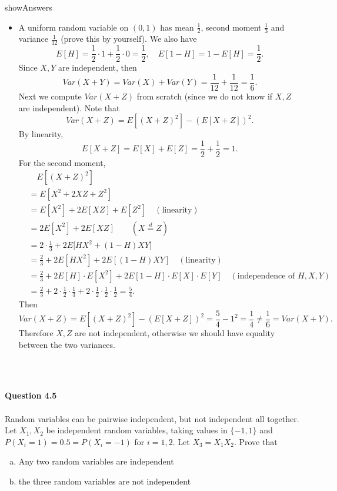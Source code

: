 \documentclass{article}
\begin{document}
\begin{maybePrint}{showAnswers}
{\begin{itemize}
\item[(b)] A uniform random variable on $(0,1)$ has mean $\frac{1}{2}$, second moment $\frac{1}{3}$ and variance $\frac{1}{12}$ (prove this by yourself). We also have 
$$ E[H]=\frac{1}{2}\cdot 1+\frac{1}{2}\cdot 0=\frac{1}{2}, \quad  E[1-H]=1- E[H]=\frac{1}{2}.$$
Since $X,Y$ are independent, then
$$ Var(X+Y)= Var(X)+ Var(Y)=\frac{1}{12}+\frac{1}{12}=\frac{1}{6}.$$
Next we compute $ Var(X+Z)$ from scratch (since we do not know if $X,Z$ are independent). Note that 
$$ Var(X+Z)= E[(X+Z)^2]-( E[X+Z])^2.$$
By linearity, 
$$ E[X+Z]= E[X]+ E[Z]=\frac{1}{2}+\frac{1}{2}=1.$$
For the second moment,
\begin{align*}
&\quad  E[(X+Z)^2]&\\
&= E[X^2+2XZ+Z^2]&\\
&= E[X^2]+2 E[XZ]+ E[Z^2] \quad (\text{linearity})&\\
&=2 E[X^2]+2 E[XZ] \quad\quad  (X\stackrel{d}{=}Z)&\\
&=2\cdot\frac{1}{3}+2 E\big[HX^2+(1-H)XY\big]&\\
&=\frac{2}{3}+2 E[HX^2]+2 E[(1-H)XY]\quad (\text{linearity})&\\
&=\frac{2}{3}+2 E[H]\cdot E[X^2]+2 E[1-H]\cdot E[X]\cdot E[Y]\quad (\text{independence of } H, X, Y)&\\
&=\frac{2}{3}+2\cdot\frac{1}{2}\cdot\frac{1}{3}+2\cdot\frac{1}{2}\cdot\frac{1}{2}\cdot\frac{1}{2}=\frac{5}{4}.&
\end{align*}
Then 
$$ Var(X+Z)= E[(X+Z)^2]-( E[X+Z])^2=\frac{5}{4}-1^2=\frac{1}{4}\neq \frac{1}{6}= Var(X+Y).$$
Therefore $X,Z$ are not independent, otherwise we should have equality between the two variances. 
\end{itemize}
}
~\\~\\
\end{maybePrint}
%
%
{\bf Question 4.5}
~\\~\\
Random variables can be pairwise independent, but not independent all together. Let $X_1, X_2$ be independent random variables, taking values in $\{-1,1\}$ and $ P(X_i=1)=0.5= P(X_i=-1)$ for $i=1,2$. Let $X_3=X_1X_2.$ Prove that 
\begin{enumerate}[(a)]
    \item Any two random variables are independent
    \item the three random variables are not independent
\end{enumerate}
\end{document}
